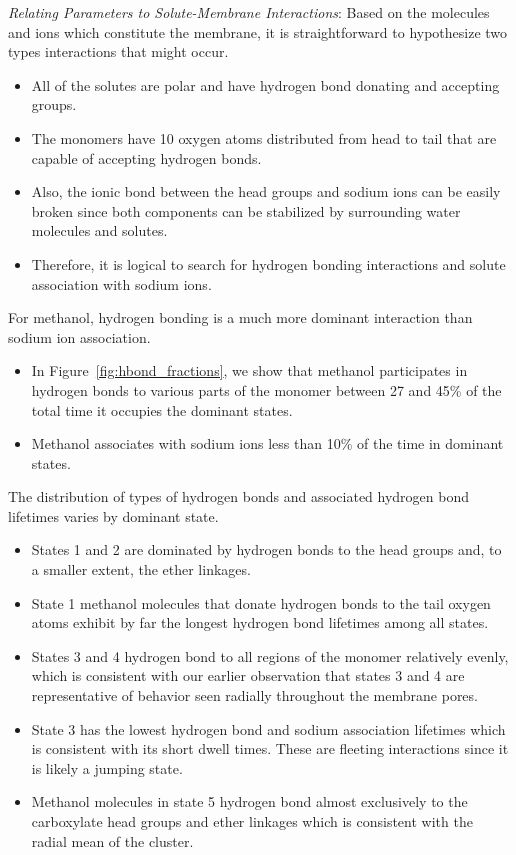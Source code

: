 \documentclass[journal=jpcbfk,manuscript=article]{achemso}
\begin{document}
  \textit{Relating Parameters to Solute-Membrane Interactions}: Based on the
  molecules and ions which constitute the membrane, it is straightforward to 
  hypothesize two types interactions that might occur.
  \begin{itemize}  
    \item All of the solutes are polar and have hydrogen bond donating and 
    accepting groups. 
    \item The monomers have 10 oxygen atoms distributed from head to tail that are 
    capable of accepting hydrogen bonds. 
    \item Also, the ionic bond between the head groups and sodium ions can
    be easily broken since both components can be stabilized by surrounding 
    water molecules and solutes.
    \item Therefore, it is logical to search for hydrogen bonding interactions
    and solute association with sodium ions.
  \end{itemize}
  For methanol, hydrogen bonding is a much more dominant interaction than sodium
  ion association. 
  \begin{itemize}
    \item In Figure~\ref{fig:hbond_fractions}, we show that methanol participates
    in hydrogen bonds to various parts of the monomer between 27 and 45\% of the
    total time it occupies the dominant states.
    \item Methanol associates with sodium ions less than 10\% of the time in 
    dominant states.
  \end{itemize}  
  
  The distribution of types of hydrogen bonds and associated hydrogen bond lifetimes
  varies by dominant state.
  \begin{itemize}
    \item States 1 and 2 are dominated by hydrogen bonds to the head groups and, to 
    a smaller extent, the ether linkages.
    \item State 1 methanol molecules that donate hydrogen bonds to the tail oxygen 
    atoms exhibit by far the longest hydrogen bond lifetimes among all states.
    \item States 3 and 4 hydrogen bond to all regions of the monomer relatively 
    evenly, which is consistent with our earlier observation that states 3 and 4
    are representative of behavior seen radially throughout the membrane pores.
    \item State 3 has the lowest hydrogen bond and sodium association lifetimes 
    which is consistent with its short dwell times. These are fleeting interactions
    since it is likely a jumping state.
    \item Methanol molecules in state 5 hydrogen bond almost exclusively to the 
    carboxylate head groups and ether linkages which is consistent with the radial
    mean of the cluster.
  \end{itemize}
  
\end{document}

